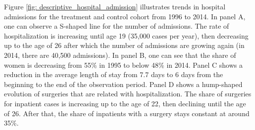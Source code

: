 \documentclass[11pt, a4paper]{article} %
\begin{document}
Figure \ref{fig: descriptive_hospital_admission} illustrates trends in hospital admissions for the treatment and control cohort from 1996 to 2014. In panel A, one can observe a S-shaped line for the number of admissions. The rate of hospitalization is increasing until age 19 (35,000 cases per year), then decreasing up to the age of 26 after which the number of admissions are growing again (in 2014, there are 40,500 admissions). In panel B, one can see that the share of women is decreasing from 55\% in 1995 to below 48\% in 2014. Panel C shows a reduction in the average length of stay from 7.7 days to 6 days from the beginning to the end of the observation period. Panel D shows a hump-shaped evolution of surgeries that are related with hospitalization. The share of surgeries for inpatient cases is increasing up to the age of 22, then declining until the age of 26. After that, the share of inpatients with a surgery stays constant at around 35\%.\newline %
\end{document}

